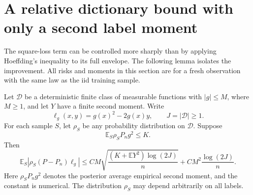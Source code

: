 \section{A relative dictionary bound with only a second label moment}
\label{sec:relative-raw-dictionary}
The square-loss term can be controlled more sharply than by applying Hoeffding's inequality to its full envelope. The following lemma isolates the improvement. All risks and moments in this section are for a fresh observation with the same law as the iid training sample.

\begin{lemma}
\label{lem:relative-raw-dictionary}
Let $\mathcal D$ be a deterministic finite class of measurable functions with $|g|\le M$, where $M\ge1$, and let $Y$ have a finite second moment. Write
\[
 \ell_g(x,y)=g(x)^2-2g(x)y,\qquad J=|\mathcal D|\ge1.
\]
For each sample $S$, let $\rho_S$ be any probability distribution on $\mathcal D$. Suppose
\[
 \mathbb E_S\rho_S P_n g^2\le K.
\]
Then
\begin{equation}
 \mathbb E_S\left|\rho_S(P-P_n)\ell_g\right|
 \le C M\sqrt{\frac{(K+\mathbb E Y^2)\log(2J)}n}
           +C M^2\frac{\log(2J)}n.
 \label{eq:relative-dictionary-bound}
\end{equation}
Here $\rho_SP_ng^2$ denotes the posterior average empirical second moment, and the constant is numerical. The distribution $\rho_S$ may depend arbitrarily on all labels.
\end{lemma}
